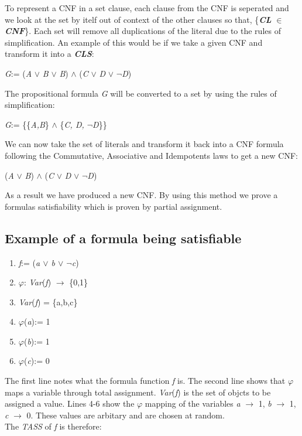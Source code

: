\documentclass[11pt,a4paper]{report}
\begin{document}
To represent a CNF in a set clause, each clause from the CNF is seperated and we look at the set by itelf out of context of the other clauses so that, \{\textbf{\textit{CL}} $\in$ \textbf{\textit{CNF}}\}. Each set will remove all duplications of the literal due to the rules of simplification. An example of this would be if we take a given CNF and transform it into a \textbf{\textit{CLS}}: 

\begin{center}
\textit{G}:= (\textit{A} $\lor$ \textit{B} $\lor$ \textit{B}) $\land$ (\textit{C} $\lor$ \textit{D} $\lor$ $\neg$\textit{D})
\end{center}

The propositional formula \textit{G} will be converted to a set by using the rules of simplification:

\begin{center}
\textit{G}:= \{\{\textit{A,B}\} $\land$ \{\textit{C, D, $\neg$D}\}\} 
\end{center}

We can now take the set of literals and transform it back into a CNF formula following the Commutative, Associative and Idempotents laws to get a new CNF:

\begin{center}
(\textit{A} $\lor$ \textit{B}) $\land$ (\textit{C} $\lor$ \textit{D} $\lor$ $\neg$\textit{D})
\end{center}
As a result we have produced a new CNF. By using this method we prove a formulas satisfiability which is proven by partial assignment. 


\subsection{Example of a formula being satisfiable}

\begin{enumerate}
\item \textit{f}:= (\textit{a $\lor$ b $\lor$ $\neg$c})
\item $\varphi$: \textit{Var}(\textit{f}) $\rightarrow$ \{0,1\}
\item \textit{Var}(\textit{f}) = \{a,b,c\}
\item $\varphi$(\textit{a}):= 1
\item $\varphi$(\textit{b}):= 1
\item $\varphi$(\textit{c}):= 0
\end{enumerate}

The first line notes what the formula function \textit{f} is. The second line shows that $\varphi$ maps a variable through total assignment. \textit{Var}(\textit{f}) is the set of objcts to be assigned a value. Lines 4-6 show the $\varphi$ mapping of the variables \textit{a} $\rightarrow$ 1, \textit{b} $\rightarrow$ 1, \textit{c} $\rightarrow$ 0. These values are arbitary and are chosen at random. \\
The \textit{TASS} of \textit{f} is therefore:
\end{document}
